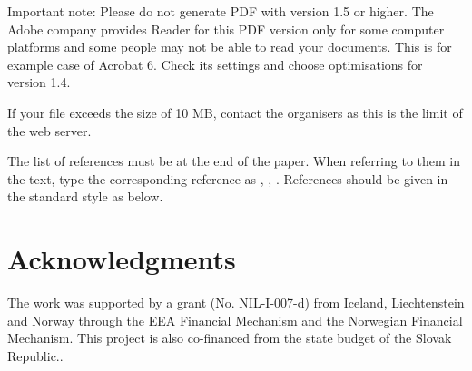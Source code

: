 \documentclass{ifacconf}
\begin{document}
Important note: Please do not generate PDF with version 1.5 or higher.
The Adobe company provides Reader for this PDF version only for some
computer platforms and some people may not be able to read your
documents. This is for example case of Acrobat 6. Check its settings
and choose optimisations for version 1.4.

If your file exceeds the size of 10 MB, contact the organisers as this
is the limit of the web server.

The list of references must be at the end of the paper. When
referring to them in the text, type the corresponding reference
as \cite{AbTaRu:54},  \cite{Abl:56},
\cite{Keo:58}.
References should be given in the standard style as below.

\section*{Acknowledgments}
The work was supported by a grant (No. NIL-I-007-d) from Iceland, Liechtenstein 
and Norway through the EEA Financial Mechanism and the Norwegian Financial 
Mechanism. This project is also co-financed from the state budget of the Slovak Republic..




%
\end{document}
